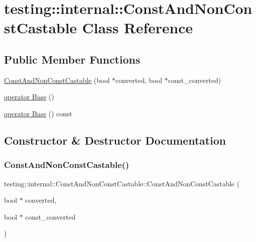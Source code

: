 \hypertarget{classtesting_1_1internal_1_1_const_and_non_const_castable}{}\section{testing\+:\+:internal\+:\+:Const\+And\+Non\+Const\+Castable Class Reference}
\label{classtesting_1_1internal_1_1_const_and_non_const_castable}
\subsection*{Public Member Functions}
\begin{DoxyCompactItemize}
\item 
\hyperlink{classtesting_1_1internal_1_1_const_and_non_const_castable_aebe0ef6897b7f805e227bb969d4ee034}{Const\+And\+Non\+Const\+Castable} (bool $\ast$converted, bool $\ast$const\+\_\+converted)
\item 
\hyperlink{classtesting_1_1internal_1_1_const_and_non_const_castable_aff0c372d429d76d002bb29f83f2429fa}{operator Base} ()
\item 
\hyperlink{classtesting_1_1internal_1_1_const_and_non_const_castable_a4e8ee8051162f1dfc1da294c71481e2f}{operator Base} () const
\end{DoxyCompactItemize}


\subsection{Constructor \& Destructor Documentation}
\mbox{\label{classtesting_1_1internal_1_1_const_and_non_const_castable_aebe0ef6897b7f805e227bb969d4ee034}} 
\subsubsection{\texorpdfstring{Const\+And\+Non\+Const\+Castable()}{ConstAndNonConstCastable()}}
{\footnotesize\ttfamily testing\+::internal\+::\+Const\+And\+Non\+Const\+Castable\+::\+Const\+And\+Non\+Const\+Castable (\begin{DoxyParamCaption}\item[{bool $\ast$}]{converted,  }\item[{bool $\ast$}]{const\+\_\+converted }\end{DoxyParamCaption})\hspace{0.3cm}{\ttfamily [inline]}}



